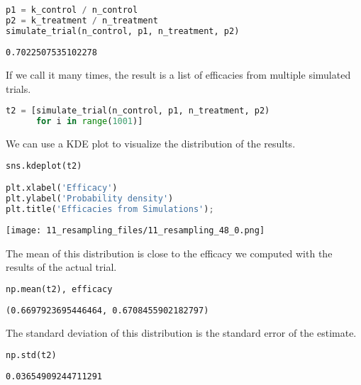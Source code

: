 \begin{lstlisting}[language=Python,style=source]
p1 = k_control / n_control
p2 = k_treatment / n_treatment
simulate_trial(n_control, p1, n_treatment, p2)
\end{lstlisting}

\begin{lstlisting}[style=output]
0.7022507535102278
\end{lstlisting}

If we call it many times, the result is a list of efficacies from
multiple simulated trials.

\begin{lstlisting}[language=Python,style=source]
t2 = [simulate_trial(n_control, p1, n_treatment, p2)
      for i in range(1001)]
\end{lstlisting}

We can use a KDE plot to visualize the distribution of the results.

\begin{lstlisting}[language=Python,style=source]
sns.kdeplot(t2)

plt.xlabel('Efficacy')
plt.ylabel('Probability density')
plt.title('Efficacies from Simulations');
\end{lstlisting}

\begin{center}
\texttt{[image: 11\_resampling\_files/11\_resampling\_48\_0.png]}
\end{center}

The mean of this distribution is close to the efficacy we computed with
the results of the actual trial.

\begin{lstlisting}[language=Python,style=source]
np.mean(t2), efficacy
\end{lstlisting}

\begin{lstlisting}[style=output]
(0.6697923695446464, 0.6708455902182797)
\end{lstlisting}

The standard deviation of this distribution is the standard error of the
estimate.

\begin{lstlisting}[language=Python,style=source]
np.std(t2)
\end{lstlisting}

\begin{lstlisting}[style=output]
0.03654909244711291
\end{lstlisting}

